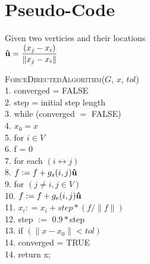 \section{Pseudo-Code}
Given two verticies and their locations \\
$\boldsymbol{\hat{\textbf{u}}} = \dfrac{(x_j-x_i)}{\|x_j-x_i\|}$
\begin{algorithm}
	\textsc{ForceDirectedAlgorithm}($G$, $x$, $tol$)\\
	1.\hspace{1em} converged = FALSE\\
	2.\hspace{1em} step = initial step length\\
	3.\hspace{1em} while (converged $=$ FALSE) \\
	4.\hspace{2em} $x_0 = x$\\
	5.\hspace{2em} for $i \in V$\\
	6.\hspace{3em} f = 0\\
	7.\hspace{3em} for each $(i \leftrightarrow j)$ \\
	8.\hspace{4em} $f : = f + g_s(i, j)\boldsymbol{\hat{\textbf{u}}}$\\
	9.\hspace{3em} for $(j \neq i, j \in V)$\\
	10.\hspace{4em} $f : = f + g_e(i, j)\boldsymbol{\hat{\textbf{u}}}$\\
	11.\hspace{3em} $x_i: = x_i + step * (f / \| f \|)$\\
	12.\hspace{3em} step $:=$ $0.9*$step\\
	13.\hspace{3em} if $(\|x - x_0\| < tol)$ \\
	14.\hspace{3em} converged = TRUE\\
	14.\hspace{2em} return x;
\end{algorithm}